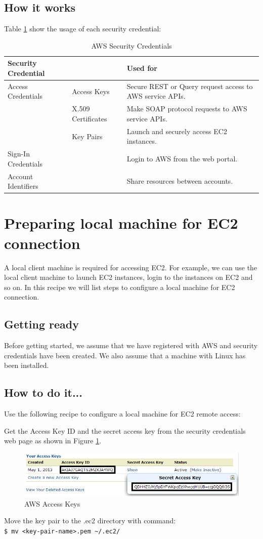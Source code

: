 \subsection*{How it works}
Table \ref{tbl:awssecurity} show the usage of each security credential:
\begin{table}[ht]
  \footnotesize
  \centering
  \begin{tabular}{lll}
    \toprule
    \textbf{Security Credential} & & \textbf{Used for} \\ \midrule
    Access Credentials & Access Keys & Secure REST or Query request access to AWS service APIs. \\
    & X.509 Certificates & Make SOAP protocol requests to AWS service APIs. \\
    & Key Pairs & Launch and securely access EC2 instances. \\
    Sign-In Credentials  & & Login to AWS from the web portal. \\
    Account Identifiers  & & Share resources between accounts. \\ \bottomrule
  \end{tabular}
  \caption{AWS Security Credentials}\label{tbl:awssecurity}
\end{table}

\section{Preparing local machine for EC2 connection}
A local client machine is required for accessing EC2. For example, we can use the local client machine to launch EC2 instances, login to the instances on EC2 and so on. In this recipe we will list steps to configure a local machine for EC2 connection.
\subsection*{Getting ready}
Before getting started, we assume that we have registered with AWS and security credentials have been created. We also assume that a machine with Linux has been installed.
\subsection*{How to do it...}
Use the following recipe to configure a local machine for EC2 remote access:

Get the Access Key ID and the secret access key from the security credentials web page as shown in Figure \ref{fig:aws.access.keys}.
\begin{figure}[ht]
  \centering
  \includegraphics[width=.8\textwidth]{figs/5163os_08_15.png}
  \caption{AWS Access Keys}\label{fig:aws.access.keys}
\end{figure} 
Move the key pair to the .ec2 directory with command: \\
\verb|$ mv <key-pair-name>.pem ~/.ec2/|

